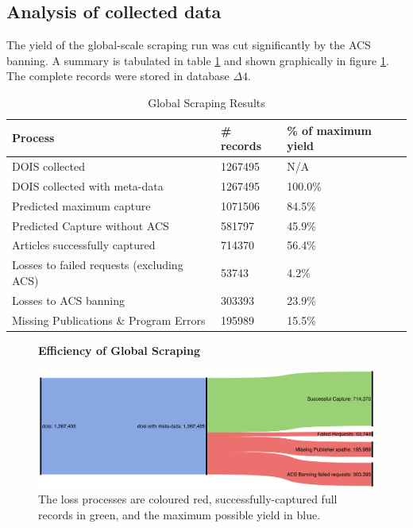 \subsection{Analysis of collected data}
The yield of the global-scale scraping run was cut significantly by the ACS banning. A summary is tabulated in table \ref{tab:LARGESCRAPERES} and shown graphically in figure \ref{fig:LARGESANK}. The complete records were stored in database $\Delta4$.
\begin{table}[H]
\caption{Global Scraping Results}
\label{tab:LARGESCRAPERES}
\begin{center}
\begin{tabular}{||l|l|l||}
\hline
Process & \# records & \% of maximum yield\\
\hline
DOIS collected &  1267495 &N/A\\
DOIS collected with meta-data &  1267495 &100.0\%\\

\hline
Predicted maximum capture & 1071506 &  84.5\%\\
Predicted Capture without ACS & 581797 & 45.9\%\\
\hline
Articles successfully captured & 714370 & 56.4\%\\
Losses to failed requests (excluding ACS)& 53743 & 4.2\%\\
Losses to ACS banning & 303393 & 23.9\%\\
Missing Publications \& Program Errors & 195989 & 15.5\%\\
\hline
\end{tabular}
\end{center}
\end{table}
\begin{figure}[H]
    \centering
    \textbf{Efficiency of Global Scraping}\par\medskip
    \includegraphics[width=\textwidth]{Data_Acquisition/large_sankey.png}
    \caption[Efficiency of Large Scale Scraping]{The loss processes are coloured red, successfully-captured full records in green, and the maximum possible yield in blue.}
     \label{fig:LARGESANK}
\end{figure}


